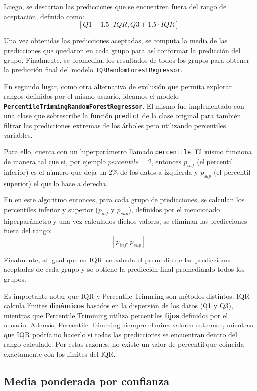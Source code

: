 Luego, se descartan las predicciones que se encuentren fuera del rango de aceptación, definido como:
\[
[Q1 - 1.5 \cdot IQR, Q3 + 1.5 \cdot IQR]
\]

Una vez obtenidas las predicciones aceptadas, se computa la media de las predicciones que quedaron en cada grupo para así conformar la predicción del grupo. Finalmente, se promedian los resultados de todos los grupos para obtener la predicción final del modelo \texttt{IQRRandomForestRegressor}.

En segundo lugar, como otra alternativa de exclusión que permita explorar rangos definidos por el mismo usuario, ideamos el modelo \textbf{\texttt{PercentileTrimmingRandomForestRegressor}}. El mismo fue implementado con una clase que sobrescribe la función \texttt{predict} de la clase original para también filtrar las predicciones extremas de los árboles pero utilizando percentiles variables.

Para ello, cuenta con un hiperparámetro llamado \texttt{percentile}. El mismo funciona de manera tal que si, por ejemplo $percentile = 2$, entonces $p_{inf}$ (el percentil inferior) es el número que deja un $2\%$ de los datos a izquierda y $p_{sup}$ (el percentil superior) el que lo hace a derecha.

En en este algoritmo entonces, para cada grupo de predicciones, se calculan los percentiles inferior y superior ($p_{inf}$ y $p_{sup}$), definidos por el mencionado hiperparámetro y una vez calculados dichos valores, se eliminan las predicciones fuera del rango:
\[
[p_{inf}, p_{sup}]
\]

Finalmente, al igual que en IQR, se calcula el promedio de las predicciones aceptadas de cada grupo y se obtiene la predicción final promediando todos los grupos.

Es importante notar que IQR y Percentile Trimming son métodos distintos. IQR calcula límites \textbf{dinámicos} basados en la dispersión de los datos (Q1 y Q3), mientras que Percentile Trimming utiliza percentiles \textbf{fijos} definidos por el usuario. Además, Percentile Trimming siempre elimina valores extremos, mientras que IQR podría no hacerlo si todas las predicciones se encuentran dentro del rango calculado. Por estas razones, no existe un valor de percentil que coincida exactamente con los límites del IQR.

\subsection{Media ponderada por confianza}

